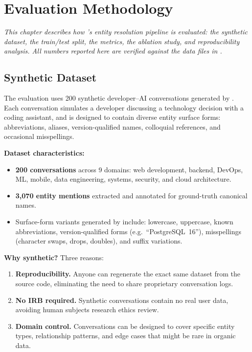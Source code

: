 \chapter{Evaluation Methodology}
\label{ch:evaluation-methodology}

\textit{This chapter describes how \sysname{}'s entity resolution pipeline
is evaluated: the synthetic dataset, the train/test split, the metrics,
the ablation study, and reproducibility analysis.  All numbers reported
here are verified against the data files in
.}


\section{Synthetic Dataset}
\label{sec:eval-synthetic-dataset}

The evaluation uses 200 synthetic developer--AI conversations generated by
.  Each conversation
simulates a developer discussing a technology decision with a coding
assistant, and is designed to contain diverse entity surface forms:
abbreviations, aliases, version-qualified names, colloquial references,
and occasional misspellings.

\medskip\noindent\textbf{Dataset characteristics:}

\begin{itemize}
    \item \textbf{200 conversations} across 9 domains: web development,
          backend, DevOps, ML, mobile, data engineering, systems,
          security, and cloud architecture.
    \item \textbf{3,070 entity mentions} extracted and annotated for
          ground-truth canonical names.
    \item Surface-form variants generated by
           include: lowercase, uppercase,
          known abbreviations, version-qualified forms (e.g.\
          ``PostgreSQL~16''), misspellings (character swaps, drops,
          doubles), and suffix variations.
\end{itemize}

\medskip\noindent\textbf{Why synthetic?}  Three reasons:

\begin{enumerate}
    \item \textbf{Reproducibility.}  Anyone can regenerate the exact same
          dataset from the source code, eliminating the need to share
          proprietary conversation logs.
    \item \textbf{No IRB required.}  Synthetic conversations contain no
          real user data, avoiding human subjects research ethics review.
    \item \textbf{Domain control.}  Conversations can be designed to
          cover specific entity types, relationship patterns, and edge
          cases that might be rare in organic data.
\end{enumerate}


